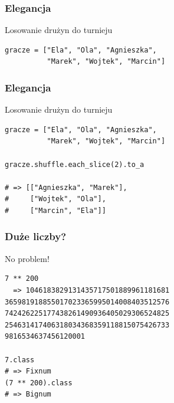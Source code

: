 \begin{frame}[fragile]
\frametitle{Elegancja}
\begin{block}{Losowanie drużyn do turnieju}
\begin{lstlisting}[style=Ruby]
gracze = ["Ela", "Ola", "Agnieszka",
          "Marek", "Wojtek", "Marcin"]
\end{lstlisting}
\end{block}
\end{frame}
\begin{frame}[fragile]
\frametitle{Elegancja}
\begin{block}{Losowanie drużyn do turnieju}
\begin{lstlisting}[style=Ruby]
gracze = ["Ela", "Ola", "Agnieszka",
          "Marek", "Wojtek", "Marcin"]

gracze.shuffle.each_slice(2).to_a

# => [["Agnieszka", "Marek"],
#     ["Wojtek", "Ola"],
#     ["Marcin", "Ela"]]
\end{lstlisting}
\end{block}
\end{frame}


\begin{frame}[fragile]
\frametitle{Duże liczby?}
\begin{block}{No problem!}
\begin{lstlisting}[style=Ruby]
7 ** 200
  => 1046183829131435717501889961181681
365981918855017023365995014008403512576
742426225177438261490936405029306524825
254631417406318034368359118815075426733
9816534637456120001

7.class
# => Fixnum
(7 ** 200).class
# => Bignum
\end{lstlisting}
\end{block}
\end{frame}



